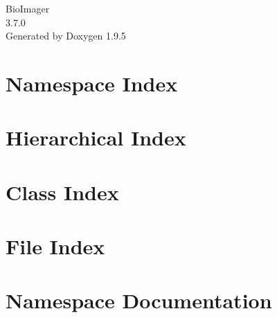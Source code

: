 \documentclass[twoside]{book}
\newcommand{\+}{\discretionary{\mbox{\scriptsize$\hookleftarrow$}}{}{}}
\newcommand{\clearemptydoublepage}{%
    \newpage{\pagestyle{empty}\cleardoublepage}%
  }
\begin{document}
  \raggedbottom
    \hypersetup{pageanchor=false,
                bookmarksnumbered=true,
                pdfencoding=unicode
               }
  \begin{titlepage}
  \vspace*{7cm}
  \begin{center}%
  {\Large Bio\+Imager}\\
  [1ex]\large 3.\+7.\+0 \\
  \vspace*{1cm}
  {\large Generated by Doxygen 1.9.5}\\
  \end{center}
  \end{titlepage}
  \clearemptydoublepage
  \tableofcontents
  \clearemptydoublepage
  \hypersetup{pageanchor=true}
\chapter{Namespace Index}

\chapter{Hierarchical Index}

\chapter{Class Index}

\chapter{File Index}

\chapter{Namespace Documentation}



\end{document}
